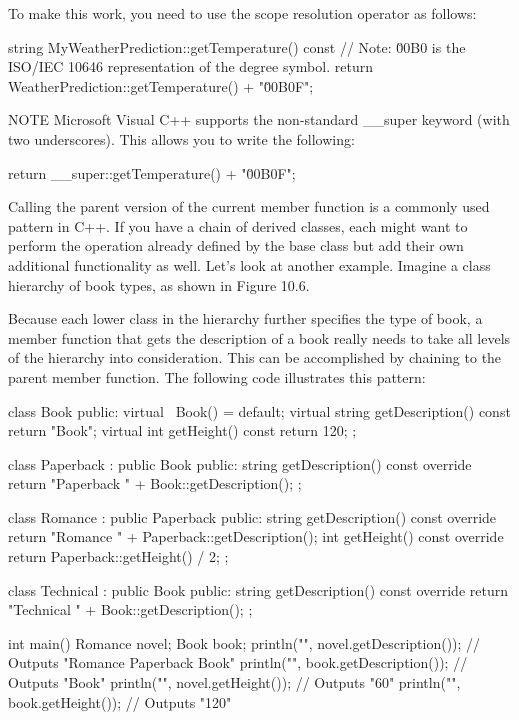 To make this work, you need to use the scope resolution operator as follows:

\begin{cpp}
string MyWeatherPrediction::getTemperature() const
{
    // Note: \u00B0 is the ISO/IEC 10646 representation of the degree symbol.
    return WeatherPrediction::getTemperature() + "\u00B0F";
}
\end{cpp}

\begin{myNotic}{NOTE}
Microsoft Visual C++ supports the non-standard \_\_super keyword (with two underscores). This allows you to write the following:

\begin{cpp}
return __super::getTemperature() + "\u00B0F";
\end{cpp}
\end{myNotic}

Calling the parent version of the current member function is a commonly used pattern in C++. If you have a chain of derived classes, each might want to perform the operation already defined by the base class but add their own additional functionality as well.
Let’s look at another example. Imagine a class hierarchy of book types, as shown in Figure 10.6.


Because each lower class in the hierarchy further specifies the type of book, a member function that gets the description of a book really needs to take all levels of the hierarchy into consideration. This can be accomplished by chaining to the parent member function. The following code illustrates this pattern:

\begin{cpp}
class Book
{
    public:
        virtual ~Book() = default;
        virtual string getDescription() const { return "Book"; }
        virtual int getHeight() const { return 120; }
};

class Paperback : public Book
{
    public:
        string getDescription() const override {
            return "Paperback " + Book::getDescription();
        }
};

class Romance : public Paperback
{
    public:
        string getDescription() const override {
            return "Romance " + Paperback::getDescription();
        }
        int getHeight() const override { return Paperback::getHeight() / 2; }
};

class Technical : public Book
{
    public:
        string getDescription() const override {
            return "Technical " + Book::getDescription();
        }
};

int main()
{
    Romance novel;
    Book book;
    println("{}", novel.getDescription()); // Outputs "Romance Paperback Book"
    println("{}", book.getDescription()); // Outputs "Book"
    println("{}", novel.getHeight()); // Outputs "60"
    println("{}", book.getHeight()); // Outputs "120"
}
\end{cpp}

